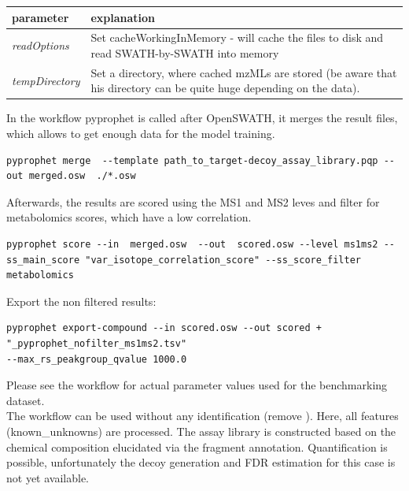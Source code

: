 \begin{center}
\begin{tabular*}{\textwidth}{ p{5.5cm}|p{10.5cm} }
\textbf{parameter} & \textbf{explanation} \\ \hline
\textit{readOptions} & Set cacheWorkingInMemory - will cache the files to disk and read SWATH-by-SWATH into memory\\
\textit{tempDirectory} &  Set a directory, where cached mzMLs are stored (be aware that his directory can be quite huge depending on the data). \\
\end{tabular*}
\end{center} 

\noindent In the workflow pyprophet is called after OpenSWATH, it merges the result files, which allows to get enough data for the model training. 

\begin{lstlisting}
pyprophet merge  --template path_to_target-decoy_assay_library.pqp --out merged.osw  ./*.osw
\end{lstlisting}

\noindent Afterwards, the results are scored using the MS1 and MS2 leves and filter for metabolomics scores, which have a low correlation. 

\begin{lstlisting}
pyprophet score --in  merged.osw  --out  scored.osw --level ms1ms2 --ss_main_score "var_isotope_correlation_score" --ss_score_filter metabolomics
\end{lstlisting}
\noindent Export the non filtered results: 

\begin{lstlisting}
pyprophet export-compound --in scored.osw --out scored + "_pyprophet_nofilter_ms1ms2.tsv" 
--max_rs_peakgroup_qvalue 1000.0
\end{lstlisting}
\noindent Please see the workflow for actual parameter values used for the benchmarking dataset. \\


\noindent  The workflow can be used without any identification (remove ). Here, all features (known\_unknowns) are processed. The assay library is constructed based on the chemical composition elucidated via the fragment annotation. Quantification is possible, unfortunately the decoy generation and FDR estimation for this case is not yet available. 


